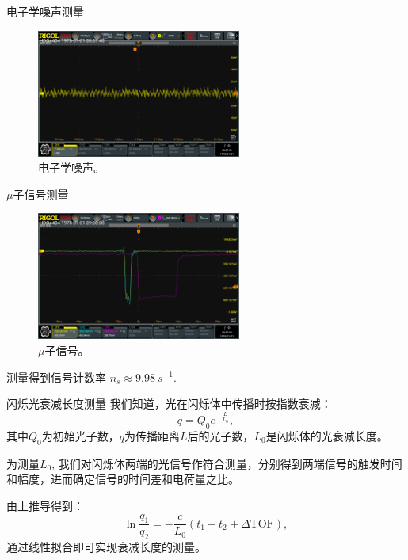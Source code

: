 \documentclass[10pt]{beamer}
\begin{document}
\begin{frame}[label={sec:org7d2cd88}]{电子学噪声测量}
\begin{figure}[htbp]
\centering
\includegraphics[width=0.6\textwidth]{../ExperimentData/figs/elenoise0.png}
\caption{电子学噪声。}
\end{figure}
\end{frame}
\begin{frame}[label={sec:org9e0e478}]{\(\mu\)子信号测量}
\begin{figure}[htbp]
\centering
\includegraphics[width=0.6\textwidth]{../ExperimentData/figs/musignal0.png}
\caption{\(\mu\)子信号。}
\end{figure}

测量得到信号计数率 \(n_s \approx \qty{9.98}{s^{-1}}\).
\end{frame}
\begin{frame}[label={sec:org830efa8}]{闪烁光衰减长度测量}
我们知道，光在闪烁体中传播时按指数衰减：
\begin{equation}
\label{eq:1}
q = Q_0 e^{-\frac{L}{L_0}},
\end{equation}
其中\(Q_0\)为初始光子数，\(q\)为传播距离\(L\)后的光子数，\(L_0\)是闪烁体的光衰减长度。

为测量\(L_0\), 我们对闪烁体两端的光信号作符合测量，分别得到两端信号的触发时间和幅度，进而确定信号的时间差和电荷量之比。

由上推导得到：
\begin{equation}
\label{eq:2}
\ln \frac{q_1}{q_2} = -\frac{c}{L_0}(t_1 - t_2+\Delta \mathrm{TOF}),
\end{equation}
通过线性拟合即可实现衰减长度的测量。
\end{frame}
\end{document}
